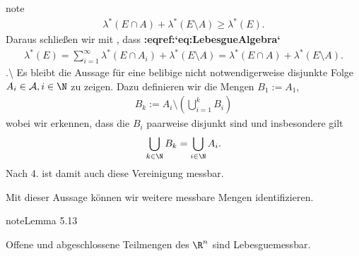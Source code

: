 \documentclass[letterpaper,10pt,german]{jupyterBook}
\begin{document}
\begin{sphinxadmonition}{note}
\begin{equation*}
\begin{split}
\lambda^\ast(E\cap A) + \lambda^\ast(E\setminus A) \geq \lambda^\ast(E).\end{split}
\end{equation*}
\sphinxAtStartPar
Daraus schließen wir mit , dass {\color{red}\bfseries{}:eqref:`eq:LebesgueAlgebra`}
\begin{equation*}
\begin{split}\lambda^\ast(E) = \sum_{i=1}^\infty \lambda^\ast(E\cap A_i) + \lambda^\ast(E\setminus A) =
\lambda^\ast(E\cap A) + \lambda^\ast(E\setminus A).\end{split}
\end{equation*}
.\textbackslash{} Es bleibt die Aussage für eine belibige nicht notwendigerweise disjunkte Folge \(A_i\in\mathcal{A}, i\in\N\) zu zeigen. Dazu definieren wir die Mengen \(B_1:=A_1\),
\begin{equation*}
\begin{split}B_k := A_i\setminus \left(\bigcup_{i=1}^k B_i  \right)\end{split}
\end{equation*}
\sphinxAtStartPar
wobei wir erkennen, dass die \(B_i\) paarweise disjunkt sind und insbesondere gilt
\begin{equation*}
\begin{split}\bigcup_{k\in\N} B_k = \bigcup_{i\in\N} A_i.\end{split}
\end{equation*}
\sphinxAtStartPar
Nach 4. ist damit auch diese Vereinigung messbar.
\end{sphinxadmonition}

\sphinxAtStartPar
Mit dieser Aussage können wir weitere messbare Mengen identifizieren.
\label{masstheorie/masstheorie:thm:lebesgueOffenAbgeschlossen}
\begin{sphinxadmonition}{note}{Lemma 5.13}



\sphinxAtStartPar
Offene und abgeschlossene Teilmengen des \(\R^n\) sind Lebesgue\sphinxhyphen{}messbar.
\end{sphinxadmonition}
\end{document}
